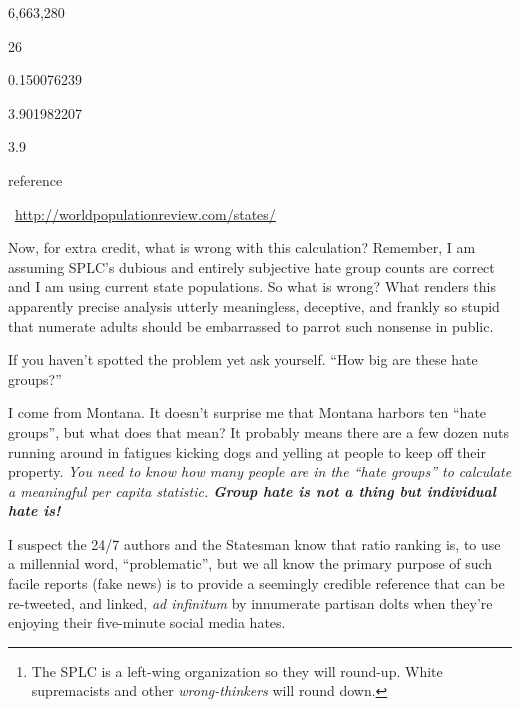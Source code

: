 6,663,280

26

0.150076239

3.901982207

3.9

reference

~\url{http://worldpopulationreview.com/states/}

Now, for extra credit, what is wrong with this calculation? Remember, I
am assuming SPLC's dubious and entirely subjective hate group counts are
correct and I am using current state populations. So what is wrong? What
renders this apparently precise analysis utterly meaningless, deceptive,
and frankly so stupid that numerate adults should be embarrassed to
parrot such nonsense in public.

If you haven't spotted the problem yet ask yourself. ``How big are these
hate groups?''

I come from Montana. It doesn't surprise me that Montana harbors ten
``hate groups'', but what does that mean? It probably means there are a
few dozen nuts running around in fatigues kicking dogs and yelling at
people to keep off their property. \emph{You need to know how many
people are in the ``hate groups'' to calculate a meaningful per capita
statistic. \textbf{Group hate is not a thing but individual hate is!}}

I suspect the 24/7 authors and the Statesman know that ratio ranking is,
to use a millennial word, ``problematic'', but we all know the primary
purpose of such facile reports (fake news) is to provide a seemingly
credible reference that can be re-tweeted, and linked, \emph{ad
infinitum} by innumerate partisan dolts when they're enjoying their
five-minute social media hates.

\begin{center}\rule{0.5\linewidth}{\linethickness}\end{center}

\begin{enumerate}
\item
  \hypertarget{fn1}{}

  The SPLC is a left-wing organization so they will round-up. White
  supremacists and other \emph{wrong-thinkers} will round
  down.\protect\hyperlink{fnref1}{↩}
\end{enumerate}


%
 
 
